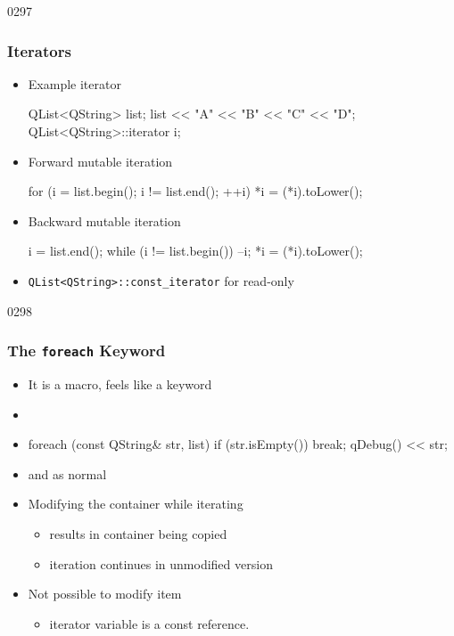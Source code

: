 \begin{slide}[fragile]{0297}\frametitle{ Iterators}
\vspace*{-4mm}
\begin{itemize}
  \item Example  iterator
\begin{cpp}
QList<QString> list;
list << "A" << "B" << "C" << "D";
QList<QString>::iterator i;
\end{cpp}
\item Forward mutable iteration
\begin{cpp}
for (i = list.begin(); i != list.end(); ++i) {
    *i = (*i).toLower();
}
\end{cpp}
\item Backward mutable iteration
\begin{cpp}
i = list.end();
while (i != list.begin()) {
    --i;
    *i = (*i).toLower();
}
\end{cpp}  
\item \lstinline{QList<QString>::const_iterator} for read-only
\end{itemize}
\end{slide}


\begin{slide}[fragile]{0298}\frametitle{The \texttt{foreach} Keyword}
\begin{itemize}
  \item It is a macro, feels like a keyword
  \item[]   
  \item[] \begin{cpp}
foreach (const QString& str, list) {
  if (str.isEmpty())
    break;
  qDebug() << str;
}    
  \end{cpp}
  \item {} and  as normal
  \item Modifying the container while iterating
  \begin{itemize}
  	\item results in container being copied
  	\item iteration continues in unmodified version
  \end{itemize}
  \item Not possible to modify item
  \begin{itemize}
  	\item iterator variable is a const reference.
  \end{itemize}
\end{itemize}
\end{slide}

